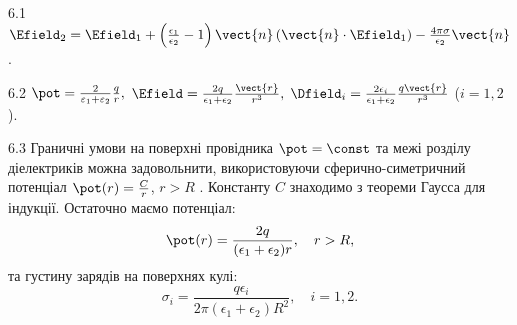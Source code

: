 \protect \section *{}
\begin{Solution}{6.{1}}
    $\Efield_2 = \Efield_1 + \left( \frac{\epsilon_1}{\epsilon _2} - 1 \right)\vect{n}\left( \vect{n} \cdot \Efield_1 \right) - \frac{4\pi \sigma }{\epsilon _2}{\vect{n}}$.
\end{Solution}
\begin{Solution}{6.{2}}
	$
		\pot  = \frac{2}{{{\varepsilon _1} + {\varepsilon _2}}}\frac{q}{r},
	$
	$
		\Efield = \frac{2q}{\epsilon_1 + \epsilon_2}\frac{\vect{r}}{r^3},
	$
	$ \Dfield_i = \frac{2\epsilon_i}{\epsilon_1 + \epsilon_2}\frac{q\vect{r}}{r^3} $ ($i = 1,2$).
\end{Solution}
\begin{Solution}{6.{3}}
	Граничні умови на поверхні провідника $\pot = \const$  та межі розділу діелектриків можна задовольнити, використовуючи сферично-симетричний потенціал  $\pot(r) = \frac{C}{r}$, $r > R$ . Константу $C$ знаходимо з теореми Гаусса для індукції. Остаточно маємо потенціал:
	\[
		\pot(r) = \frac{2q}{(\epsilon_1 + \epsilon_2)r}, \quad r > R,
	\]
	та густину зарядів на поверхнях кулі:
	\[
		\sigma_i = \frac{q\epsilon_i}{2\pi(\epsilon_1 + \epsilon_2)R^2}, \quad i = 1,2.
	\]
\end{Solution}
